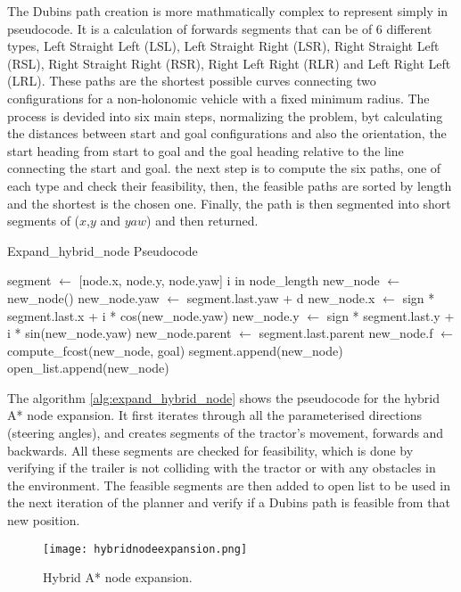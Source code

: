 The Dubins path creation is more mathmatically complex to represent simply in pseudocode. 
It is a calculation of forwards segments that can be of 6 different types, 
Left Straight Left (LSL), Left Straight Right (LSR), Right Straight Left (RSL), Right Straight Right (RSR), 
Right Left Right (RLR) and Left Right Left (LRL). These paths are the shortest possible 
curves connecting two configurations for a non-holonomic vehicle with a fixed minimum radius.
The process is devided into six main steps, normalizing the problem, byt calculating the 
distances between start and goal configurations and also the orientation, the start 
heading from start to goal and the goal heading relative to the line connecting the start and goal. 
the next step is to compute the six paths, one of each type and check their feasibility, then, 
the feasible paths are sorted by length and the shortest is the chosen one. Finally, 
the path is then segmented into short segments of ($x$,$y$ and $yaw$) and then returned.
\begin{algorithm}[h]
\caption{Expand\_hybrid\_node Pseudocode}
\label{alg:expand_hybrid_node}
\begin{algorithmic}[1]
            \State segment $\gets$ [node.x, node.y, node.yaw]
            \For i in node\_length
                \State new\_node $\gets$ new\_node()
                \State new\_node.yaw $\gets$ segment.last.yaw + d
                \State new\_node.x $\gets$ sign * segment.last.x + i * cos(new\_node.yaw)
                \State new\_node.y $\gets$ sign * segment.last.y + i * sin(new\_node.yaw)
                \State new\_node.parent $\gets$ segment.last.parent
                \State new\_node.f $\gets$ compute\_fcost(new\_node, goal)
                \State segment.append(new\_node)
            \EndFor
                \State open\_list.append(new\_node)
            \EndIf
        \EndFor
    \EndFor
\EndFunction
\end{algorithmic}
\end{algorithm}

The algorithm \ref{alg:expand_hybrid_node} shows the pseudocode for the hybrid A* node expansion. It first 
iterates through all the parameterised directions (steering angles), and creates 
segments of the tractor's movement, forwards and backwards. All these segments are checked for 
feasibility, which is done by verifying if the trailer is not colliding with the tractor or 
with any obstacles in the environment. The feasible segments are then added to open list to be used 
in the next iteration of the planner and verify if a Dubins path is feasible from that new position.
\begin{figure}[h]
    \centering
    \texttt{[image: hybridnodeexpansion.png]}
    \caption{Hybrid A* node expansion.}
    \label{fig:hybridnodeexpansion}
\end{figure}

